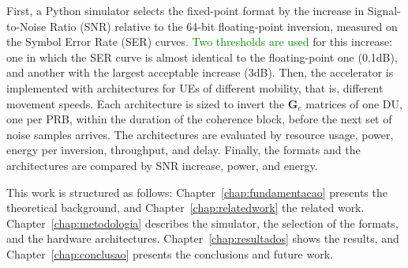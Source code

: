 First, a Python simulator selects the fixed-point format by the increase in Signal-to-Noise Ratio (SNR) relative to the 64-bit floating-point inversion, measured on the Symbol Error Rate (SER) curves\textcolor{GREEN}{. Two thresholds are used} for this increase: one in which the SER curve is almost identical to the floating-point one (0.1dB), and another with the largest acceptable increase (3dB). Then, the accelerator is implemented with architectures for UEs of different mobility, that is, different movement speeds. Each architecture is sized to invert the $\mathbf G_c$ matrices of one DU, one per PRB, within the duration of the coherence block, before the next set of noise samples arrives. The architectures are evaluated by resource usage, power, energy per inversion, throughput, and delay. Finally, the formats and the architectures are compared by SNR increase, power, and energy.

This work is structured as follows: Chapter~\ref{chap:fundamentacao} presents the theoretical background, and Chapter~\ref{chap:relatedwork} the related work. Chapter~\ref{chap:metodologia} describes the simulator, the selection of the formats, and the hardware architectures. Chapter~\ref{chap:resultados} shows the results, and Chapter~\ref{chap:conclusao} presents the conclusions and future work.
